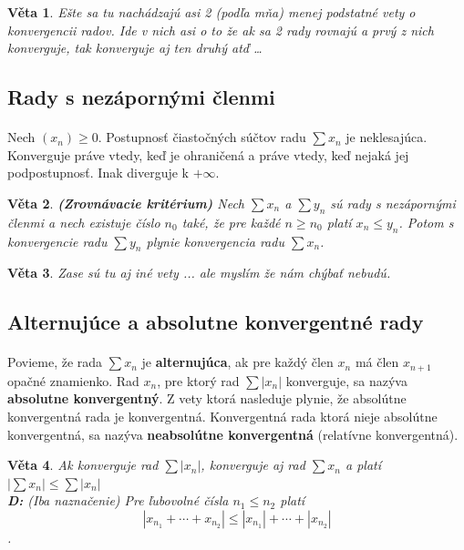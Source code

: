\documentclass[12pt,a4paper]{article}
\newtheorem{sentence}{Věta}
\begin{document}
\begin{sentence}
	Ešte sa tu nachádzajú asi 2 (podľa mňa) menej podstatné vety o konvergencii radov. Ide v nich asi o to že ak sa 2 rady rovnajú a prvý z nich konverguje, tak konverguje aj ten druhý atď \dots
\end{sentence}

\subsection{Rady s nezápornými členmi}
\paragraph{}
Nech $(x_{n})\geq 0$. Postupnosť čiastočných súčtov radu $\sum x_{n}$ je neklesajúca. Konverguje práve vtedy, keď je ohraničená a práve vtedy, keď nejaká jej podpostupnosť. Inak diverguje k $+\infty$.

\begin{sentence}
	\textbf{(Zrovnávacie kritérium)} Nech $\sum x_{n}$ a $\sum y_{n}$ sú rady s nezápornými členmi a nech existuje číslo $n_{0}$ také, že pre každé $n\geq n_{0}$ platí $x_{n}\leq y_{n}$. Potom s konvergencie radu $\sum y_{n}$ plynie konvergencia radu $\sum x_{n}$.
\end{sentence}

\begin{sentence}
	Zase sú tu aj iné vety ... ale myslím že nám chýbať nebudú.
\end{sentence}

\subsection{Alternujúce a absolutne konvergentné rady}
\paragraph{}
Povieme, že rada $\sum x_{n}$ je \textbf{alternujúca}, ak pre každý člen $x_{n}$ má člen $x_{n+1}$ opačné znamienko. Rad $x_{n}$, pre ktorý rad $\sum |x_{n}|$ konverguje, sa nazýva \textbf{absolutne konvergentný}.  Z vety ktorá nasleduje plynie, že absolútne konvergentná rada je konvergentná. Konvergentná rada ktorá nieje absolútne konvergentná, sa nazýva \textbf{neabsolútne konvergentná} (relatívne konvergentná).

\begin{sentence}
	Ak konverguje rad $\sum |x_{n}|$, konverguje aj rad $\sum x_{n}$ a platí $|\sum x_{n}|\leq \sum |x_{n}|$\\ \textbf{D:} (Iba naznačenie) Pre ľubovolné čísla $n_{1}\leq n_{2}$ platí $$|x_{n_{1}}+ \dotsm + x_{n_{2}}|\leq |x_{n_{1}}| + \dotsm + |x_{n_{2}}|$$.
\end{sentence}
\end{document}
